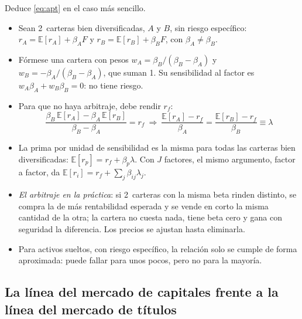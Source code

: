 \documentclass[11pt]{article}
\begin{document}
Deduce \eqref{eq:apt} en el caso más sencillo\nocite{BodieKaneMarcus2021Investments}.
\begin{itemize}
\item Sean 2~carteras bien diversificadas, $A$ y $B$, sin riesgo específico: $r_A=\mathbb{E}[r_A]+\beta_AF$ y $r_B=\mathbb{E}[r_B]+\beta_BF$, con $\beta_A\neq\beta_B$.
\item Fórmese una cartera con pesos $w_A=\beta_B/(\beta_B-\beta_A)$ y $w_B=-\beta_A/(\beta_B-\beta_A)$, que suman 1. Su sensibilidad al factor es $w_A\beta_A+w_B\beta_B=0$: no tiene riesgo.
\item Para que no haya arbitraje, debe rendir $r_f$:
  \[
  \frac{\beta_B\,\mathbb{E}[r_A]-\beta_A\,\mathbb{E}[r_B]}{\beta_B-\beta_A}=r_f\ \Rightarrow\ \frac{\mathbb{E}[r_A]-r_f}{\beta_A}=\frac{\mathbb{E}[r_B]-r_f}{\beta_B}\equiv\lambda
  \]
\item La prima por unidad de sensibilidad es la misma para todas las carteras bien diversificadas: $\mathbb{E}[r_p]=r_f+\beta_p\lambda$. Con $J$ factores, el mismo argumento, factor a factor, da $\mathbb{E}[r_i]=r_f+\sum_j\beta_{ij}\lambda_j$. \findemo
\item \emph{El arbitraje en la práctica}: si 2~carteras con la misma beta rinden distinto, se compra la de más rentabilidad esperada y se vende en corto la misma cantidad de la otra; la cartera no cuesta nada, tiene beta cero y gana con seguridad la diferencia. Los precios se ajustan hasta eliminarla.
\item Para activos sueltos, con riesgo específico, la relación solo se cumple de forma aproximada: puede fallar para unos pocos, pero no para la mayoría\nocite{Ross1976Arbitrage}.
\end{itemize}

\subsection{La línea del mercado de capitales frente a la línea del mercado de títulos}\label{anexo:cml-sml}
\end{document}
